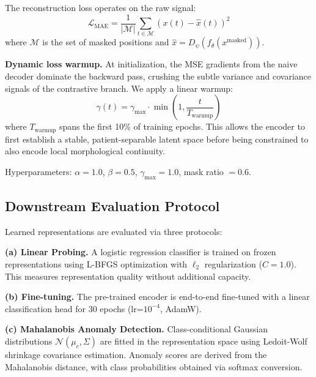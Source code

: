 \documentclass[journal,10pt]{IEEEtran}
\begin{document}
The reconstruction loss operates on the raw signal:
\begin{equation}
    \mathcal{L}_{\text{MAE}} = \frac{1}{|\mathcal{M}|} \sum_{t \in \mathcal{M}} \left( x(t) - \hat{x}(t) \right)^2
\end{equation}
where $\mathcal{M}$ is the set of masked positions and $\hat{x} = D_\psi(f_\theta(x^{\text{masked}}))$.

\vspace{0.3em}
\noindent\textbf{Dynamic loss warmup.} At initialization, the MSE gradients from the naive decoder dominate the backward pass, crushing the subtle variance and covariance signals of the contrastive branch. We apply a linear warmup:
\begin{equation}
    \gamma(t) = \gamma_{\max} \cdot \min\left(1, \frac{t}{T_{\text{warmup}}}\right)
\end{equation}
where $T_{\text{warmup}}$ spans the first 10\% of training epochs. This allows the encoder to first establish a stable, patient-separable latent space before being constrained to also encode local morphological continuity.

\vspace{0.3em}
\noindent Hyperparameters: $\alpha = 1.0$, $\beta = 0.5$, $\gamma_{\max} = 1.0$, mask ratio $= 0.6$.

\subsection{Downstream Evaluation Protocol}

Learned representations are evaluated via three protocols:

\vspace{0.3em}
\noindent\textbf{(a) Linear Probing.} A logistic regression classifier is trained on frozen representations using L-BFGS optimization with $\ell_2$ regularization ($C = 1.0$). This measures representation quality without additional capacity.

\vspace{0.3em}
\noindent\textbf{(b) Fine-tuning.} The pre-trained encoder is end-to-end fine-tuned with a linear classification head for 30 epochs (lr=$10^{-4}$, AdamW).

\vspace{0.3em}
\noindent\textbf{(c) Mahalanobis Anomaly Detection.} Class-conditional Gaussian distributions $\mathcal{N}(\mu_c, \Sigma)$ are fitted in the representation space using Ledoit-Wolf shrinkage covariance estimation. Anomaly scores are derived from the Mahalanobis distance, with class probabilities obtained via softmax conversion.
\end{document}
